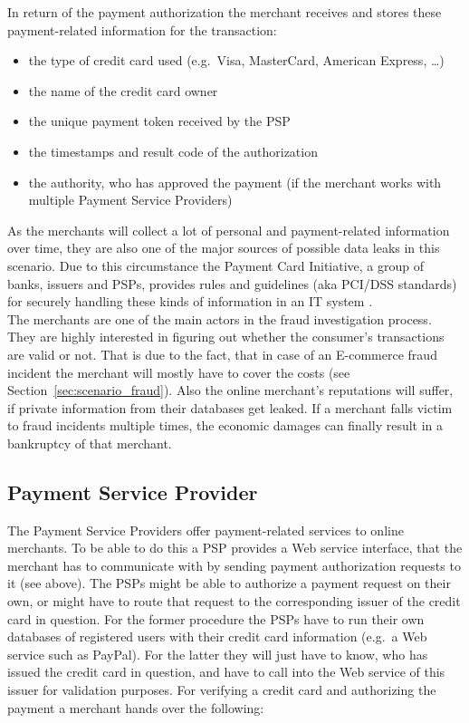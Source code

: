 In return of the payment authorization the merchant receives and stores these  payment-related information for the transaction:\@

\begin{itemize}
		\item the type of credit card used (e.g.\ Visa, MasterCard, American Express, \ldots)
		\item the name of the credit card owner
		\item the unique payment token received by the \gls{PSP}
		\item the timestamps and result code of the authorization
		\item the authority, who has approved the payment (if the merchant works with multiple Payment Service Providers)
\end{itemize}

As the merchants will collect a lot of personal and payment-related information over time, they are also one of the major sources of possible data leaks in this scenario. Due to this circumstance the Payment Card Initiative, a group of banks, issuers and \gls{PSP}s, provides rules and guidelines (aka \gls{PCI/DSS} standards) for securely handling these kinds of information in an \gls{IT} system \citep{virtue2009payment}. \\

The merchants are one of the main actors in the fraud investigation process. They are highly interested in figuring out whether the consumer's transactions are valid or not. That is due to the fact, that in case of an \gls{E-commerce} fraud incident the merchant will mostly have to cover the costs (see Section~\ref{sec:scenario_fraud}). Also the online merchant's reputations will suffer, if private information from their databases get leaked. If a merchant falls victim to fraud incidents multiple times, the economic damages can finally result in a bankruptcy of that merchant.


\subsection{Payment Service Provider}
\label{subsec:stakeholder_psp}

The Payment Service Providers offer payment-related services to online merchants. To be able to do this a \gls{PSP} provides a Web service interface, that the merchant has to communicate with by sending payment authorization requests to it (see above). The \gls{PSP}s might be able to authorize a payment request on their own, or might have to route that request to the corresponding issuer of the credit card in question. For the former procedure the \gls{PSP}s have to run their own databases of registered users with their credit card information (e.g.\ a Web service such as PayPal). For the latter they will just have to know, who has issued the credit card in question, and have to call into the Web service of this issuer for validation purposes. For verifying a credit card and authorizing the payment a merchant hands over the following:\@

